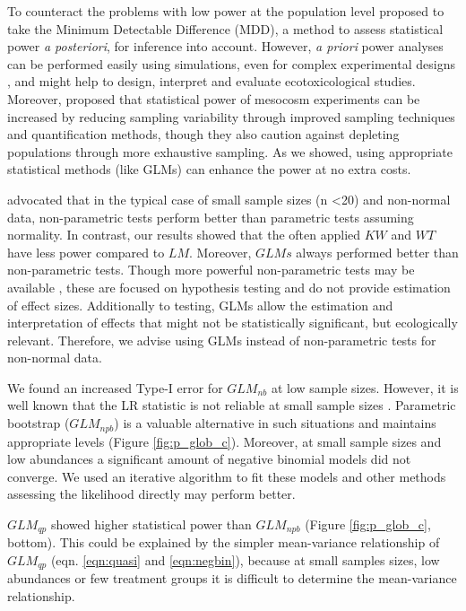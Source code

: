 \documentclass[twocolumn, natbib]{svjour3}
\begin{document}
To counteract the problems with low power at the population level \citet{brock_minimum_2015} proposed to take the Minimum Detectable Difference (MDD), a method to assess statistical power \emph{a posteriori}, for inference into account.
However, \emph{a priori} power analyses can be performed easily using simulations, even for complex experimental designs \citep{johnson_power_2014}, and might help to design, interpret and evaluate ecotoxicological studies.
Moreover, \citet{brock_minimum_2015} proposed that statistical power of mesocosm experiments can be increased by reducing sampling variability through improved sampling techniques and quantification methods, though they also caution against depleting populations through more exhaustive sampling.
As we showed, using appropriate statistical methods (like GLMs) can enhance the power at no extra costs.

\citet{wang_making_2011} advocated that in the typical case of small sample sizes (n \textless 20) and non-normal data, non-parametric tests perform better than parametric tests assuming normality.
In contrast, our results showed that the often applied $KW$ and $WT$ have less power compared to $LM$.
Moreover, $GLMs$ always performed better than non-parametric tests. 
Though more powerful non-parametric tests may be available \citep{konietschke_rank-based_2012}, these are focused on hypothesis testing and do not provide estimation of effect sizes.
Additionally to testing, GLMs allow the estimation and interpretation of effects that might not be statistically significant, but ecologically relevant.
Therefore, we advise using GLMs instead of non-parametric tests for non-normal data.

We found an increased Type-I error for $GLM_{nb}$ at low sample sizes.
However, it is well known that the LR statistic is not reliable at small sample sizes \citep{bolker_generalized_2009,wilks_large-sample_1938}.
Parametric bootstrap ($GLM_{npb}$) is a valuable alternative in such situations and maintains appropriate levels (Figure \ref{fig:p_glob_c}).
Moreover, at small sample sizes and low abundances a significant amount of negative binomial models did not converge.
We used an iterative algorithm to fit these models \citep{venables_modern_2002}and other methods assessing the likelihood directly may perform better.

$GLM_{qp}$ showed higher statistical power than $GLM_{npb}$ (Figure \ref{fig:p_glob_c}, bottom).
This could be explained by the simpler mean-variance relationship of $GLM_{qp}$ (eqn. \ref{eqn:quasi} and \ref{eqn:negbin}), because at small samples sizes, low abundances or few treatment groups it is difficult to determine the mean-variance relationship.
\end{document}
